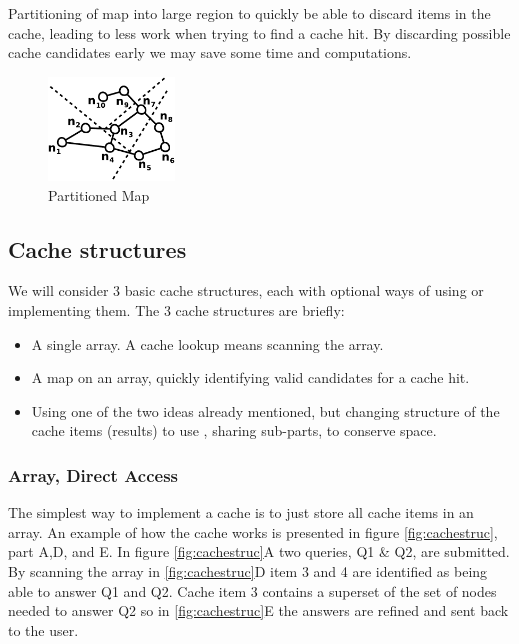 Partitioning of map into large region to quickly be able to discard items in the cache, leading to less work when trying to find a cache hit. By discarding possible \spath cache candidates early we may save some time and computations.


\begin{figure}
  \center
	\includegraphics[width=0.30\textwidth]{figures/mapPartition.pdf}
	\caption{Partitioned Map}
  \label{fig:mappartition}
\end{figure}

\subsection{Cache structures}

We will consider 3 basic cache structures, each with optional ways of using or implementing them. The 3 cache structures are briefly:
\begin{itemize}
\item A single array. A cache lookup means scanning the array.
\item A map on an array, quickly identifying valid candidates for a cache hit.
\item Using one of the two ideas already mentioned, but changing structure of the cache items (\spath results) to use \spsns, sharing sub-parts, to conserve space.
\end{itemize}

\subsubsection{Array, Direct Access}

The simplest way to implement a cache is to just store all cache items in an array. An example of how the cache works is presented in  figure \ref{fig:cachestruc}, part A,D, and E. In figure \ref{fig:cachestruc}A two \spath queries, Q1 \& Q2, are submitted. By scanning the array in \ref{fig:cachestruc}D item 3 and 4 are identified as being able to answer Q1 and Q2. Cache item 3 contains a superset of the set of nodes needed to answer Q2 so in \ref{fig:cachestruc}E the answers are refined and sent back to the user.

